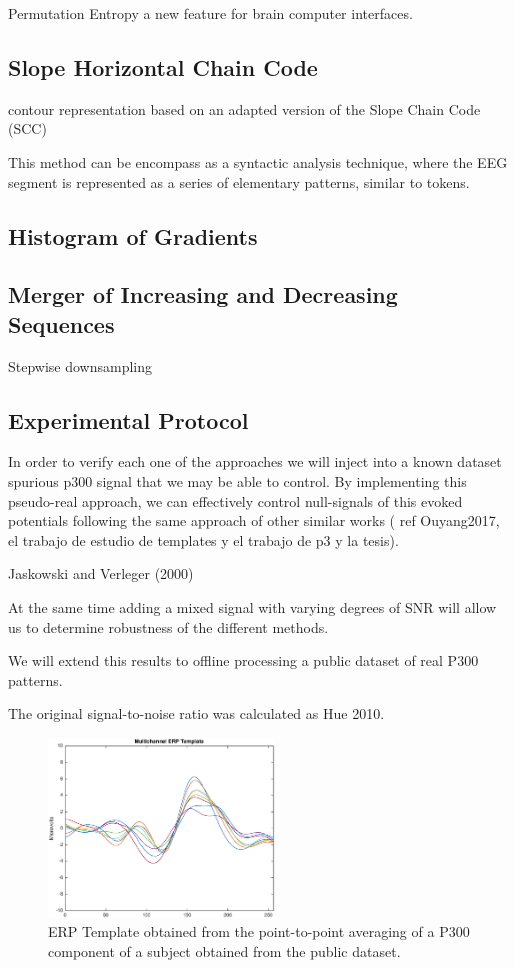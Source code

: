 \documentclass[sensors,article,submit,moreauthors,pdftex,10pt,a4paper]{mdpi}
\begin{document}
Permutation Entropy a new feature for brain computer interfaces.


\subsection{Slope Horizontal Chain Code}

contour representation based on an adapted version of the Slope Chain Code (SCC)

This method can be encompass as a syntactic analysis technique, where the EEG segment is represented as a series of elementary patterns, similar to tokens.

\subsection{Histogram of Gradients}

\subsection{Merger of Increasing and Decreasing Sequences}

Stepwise downsampling 

\subsection{Experimental Protocol}

In order to verify each one of the approaches we will inject into a known dataset spurious p300 signal that we may be able to control.  By implementing this pseudo-real approach, we can effectively control null-signals of this evoked potentials following the same approach of other similar works ( ref   Ouyang2017, el trabajo de estudio de templates y el trabajo de p3 y la tesis).

Jaskowski and Verleger (2000) 

At the same time adding a mixed signal with varying degrees of SNR will allow us to determine robustness of the different methods.

We will extend this results to offline processing a public dataset of real P300 patterns.

The original signal-to-noise ratio was calculated as Hue 2010.

\begin{figure}[H]
\centering
\includegraphics[width=6cm]{images/erptemplate1.eps}
\caption{ERP Template obtained from the point-to-point averaging of a P300 component of a subject obtained from the public dataset.}
\label{fig:erptemplate1}
\end{figure}
\end{document}
